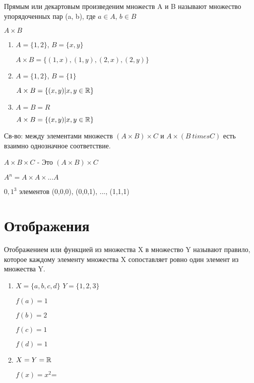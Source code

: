 Прямым или декартовым произведеним множеств A и B называют множество упорядоченных пар
(a, b), где $a \in A$, $b \in B$

\begin{notation}
    $A \times B$
\end{notation}

\begin{eg}
\begin{enumerate}
    \item {
        $A = \{1, 2\}$, $B = \{x, y\}$
    
        $A \times B = \{(1, x), (1, y), (2, x), (2, y)\}$
    }
    \item{
        $A = \{1, 2\}$, $B = \{1\}$

        $A \times B = \{(x, y) | x, y \in \mathbb{R}\}$
    }
    \item {
        $A = B = R$

        $A \times B = \{(x, y) | x, y \in \mathbb{R}\}$
    }
\end{enumerate}
\end{eg}

Св-во: между элементами множеств $(A \times B) \times C$ и $A \times (B \ times C)$ есть взаимно однозначное соответствие.

\begin{definition}
    $A \times B \times C$ - Это $(A \times B) \times C$

    $A^n = A \times A \times ... A$
\end{definition}


\begin{eg}
    ${0, 1}^3$ элементов (0,0,0), (0,0,1), ..., (1,1,1)
\end{eg}


\section{Отображения}

\begin{definition}
    Отображением или функцией из множества X в множество Y называют правило, которое каждому элементу множества X сопоставляет ровно один элемент из множества Y.
\end{definition}

\begin{eg}
\begin{enumerate}
\item {
$X = \{a, b, c, d\}$
$Y = \{1, 2, 3\}$

$f(a) = 1$

$f(b) = 2$

$f(c) = 1$

$f(d) = 1$
}
\item {
$X = Y = \mathbb{R}$

$f(x) = x^2$=
}
\end{enumerate}
\end{eg}


